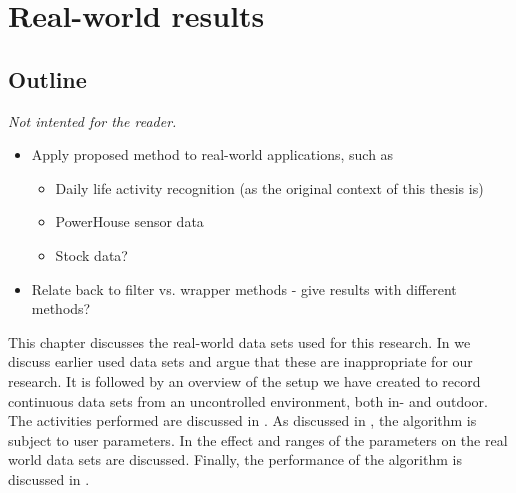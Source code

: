 
\chapter{Real-world results}

\label{Chapter6} %


\section{Outline}
\emph{Not intented for the reader.}
\begin{itemize}
  \item Apply proposed method to real-world applications, such as
    \begin{itemize}
      \item Daily life activity recognition (as the original context of this thesis is)
      \item PowerHouse sensor data
      \item Stock data?
    \end{itemize}
  \item Relate back to filter vs. wrapper methods - give results with different methods?
\end{itemize}

This chapter discusses the real-world data sets used for this research.
In  we discuss earlier used data sets and argue that these are inappropriate for our research.
It is followed by an overview of the setup we have created to record continuous data sets from an uncontrolled environment, both in- and outdoor.
The activities performed are discussed in .
As discussed in , the algorithm is subject to user parameters.
In  the effect and ranges of the parameters on the real world data sets are discussed.
Finally, the performance of the algorithm is discussed in .








